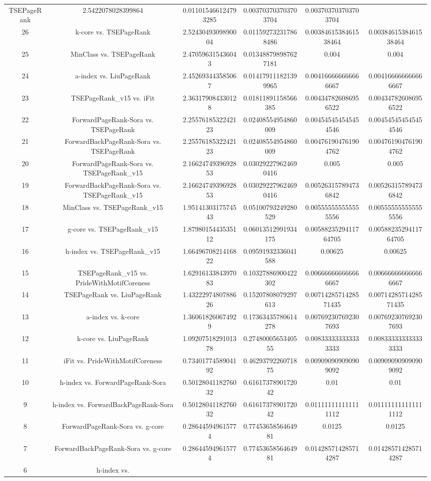 \documentclass[a4paper,10pt]{article}
\begin{document}
\begin{landscape}
\begin{table}[!htp]
\begin{tabular}{cccccc}
TSEPageRank&2.5422078028399864&0.011015466124793285&0.003703703703703704&0.003703703703703704\\26&k-core vs. TSEPageRank&2.5243049309890004&0.011592732317868486&0.0038461538461538464&0.0038461538461538464\\25&MinClass vs. TSEPageRank&2.470596315436043&0.013488798987627181&0.004&0.004\\24&a-index vs. LiuPageRank&2.452693443585067&0.014179111821399965&0.004166666666666667&0.004166666666666667\\23&TSEPageRank_v15 vs. iFit&2.363179084330128&0.01811891158566385&0.004347826086956522&0.004347826086956522\\22&ForwardPageRank-Sora vs. TSEPageRank&2.2557618532242123&0.02408554954860009&0.004545454545454546&0.004545454545454546\\21&ForwardBackPageRank-Sora vs. TSEPageRank&2.2557618532242123&0.02408554954860009&0.004761904761904762&0.004761904761904762\\20&ForwardPageRank-Sora vs. TSEPageRank_v15&2.1662474939692853&0.030292279624690416&0.005&0.005\\19&ForwardBackPageRank-Sora vs. TSEPageRank_v15&2.1662474939692853&0.030292279624690416&0.005263157894736842&0.005263157894736842\\18&MinClass vs. TSEPageRank_v15&1.9514130317574543&0.05100793249280529&0.005555555555555556&0.005555555555555556\\17&g-core vs. TSEPageRank_v15&1.8798015443535112&0.06013512991934175&0.0058823529411764705&0.0058823529411764705\\16&h-index vs. TSEPageRank_v15&1.6649670821416822&0.09591932336041588&0.00625&0.00625\\15&TSEPageRank_v15 vs. PrideWithMotifCoreness&1.6291613384397083&0.10327886900422302&0.006666666666666667&0.006666666666666667\\14&TSEPageRank vs. LiuPageRank&1.4322297480788626&0.15207808079297613&0.0071428571428571435&0.0071428571428571435\\13&a-index vs. k-core&1.360618260674929&0.17363435780614278&0.007692307692307693&0.007692307692307693\\12&k-core vs. LiuPageRank&1.0920751829101378&0.2748000565340555&0.008333333333333333&0.008333333333333333\\11&iFit vs. PrideWithMotifCoreness&0.7340177458904192&0.4629379226071875&0.009090909090909092&0.009090909090909092\\10&h-index vs. ForwardPageRank-Sora&0.5012804118276032&0.6161737890172042&0.01&0.01\\9&h-index vs. ForwardBackPageRank-Sora&0.5012804118276032&0.6161737890172042&0.011111111111111112&0.011111111111111112\\8&ForwardPageRank-Sora vs. g-core&0.286445949615774&0.7745365856464981&0.0125&0.0125\\7&ForwardBackPageRank-Sora vs. g-core&0.286445949615774&0.7745365856464981&0.014285714285714287&0.014285714285714287\\6&h-index vs. 
\end{tabular}
\end{table}
\end{landscape}
\end{document}
